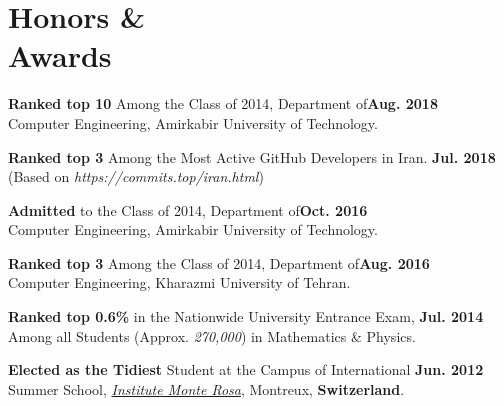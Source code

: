 \section{\sc Honors \& \\ Awards}
\textbf{Ranked top 10} Among the Class of 2014, Department of\hfill {\textbf{Aug. 2018}}\\ Computer Engineering, Amirkabir University of Technology.

\textbf{Ranked top 3} Among the Most Active GitHub Developers in Iran. \hfill {\textbf{Jul. 2018}}\\ (Based on \textit{https://commits.top/iran.html})

\textbf{Admitted} to the Class of 2014, Department of\hfill {\textbf{Oct. 2016}}\\ Computer Engineering, Amirkabir University of Technology.

\textbf{Ranked top 3} Among the Class of 2014, Department of\hfill {\textbf{Aug. 2016}}\\ Computer Engineering, Kharazmi University of Tehran.

\textbf{Ranked top 0.6\%} in the Nationwide University Entrance Exam, \hfill {\textbf{Jul. 2014}}\\ Among all Students (Approx. \textit{270,000}) in Mathematics \& Physics.

\textbf{Elected as the Tidiest} Student at the Campus of International \hfill {\textbf{Jun. 2012}}\\ Summer School, \textit{\href{https://www.monterosa.ch/}{Institute Monte Rosa}}, Montreux, \textbf{Switzerland}.


\endinput